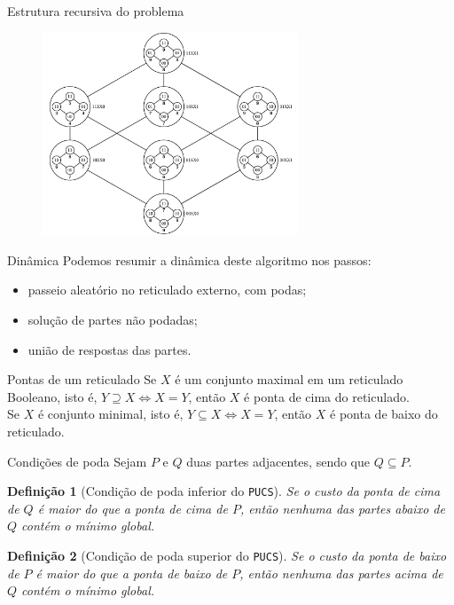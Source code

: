 \documentclass{beamer}
\newtheorem{mydefinition}{Definição}
\newcommand{\algname}[1]{\texttt{#1}}
\begin{document}
\begin{frame}{Estrutura recursiva do problema}
    \begin{figure}
    \includegraphics[clip=true, width=0.68\textwidth]{pucs/sample_run/A.pdf}
    \end{figure}
\end{frame}

\begin{frame}{Dinâmica}
    Podemos resumir a dinâmica deste algoritmo nos passos:
    \begin{itemize}
    \item{passeio aleatório no reticulado externo, com podas;}
    \item{solução de partes não podadas;}
    \item{união de respostas das partes.}
    \end{itemize}
\end{frame}

\begin{frame}{Pontas de um reticulado}
    Se $X$ é um conjunto maximal em um reticulado Booleano, isto é,
    $Y \supseteq X \iff X = Y$, então $X$ é \alert{ponta de cima} do
    reticulado.
    \vspace{1em}\pause \\

    Se $X$ é conjunto minimal, isto é, $Y \subseteq X \iff X = Y$, então
    $X$ é \alert{ponta de baixo} do reticulado.
\end{frame}

\begin{frame}{Condições de poda}
    Sejam $P$ e $Q$ duas partes adjacentes, sendo que $Q \subseteq P$.
    \pause
    \begin{mydefinition}[Condição de poda inferior do \algname{PUCS}]
        Se o custo da ponta de cima de $Q$ é maior do que a ponta de 
        cima de $P$, então nenhuma das partes abaixo de $Q$ contém o 
        mínimo global.
    \end{mydefinition}
    \pause
    \begin{mydefinition}[Condição de poda superior do \algname{PUCS}]
        Se o custo da ponta de baixo de $P$ é maior do que a ponta de 
        baixo de $P$, então nenhuma das partes acima de $Q$ contém o 
        mínimo global.
    \end{mydefinition}
\end{frame}
\end{document}
